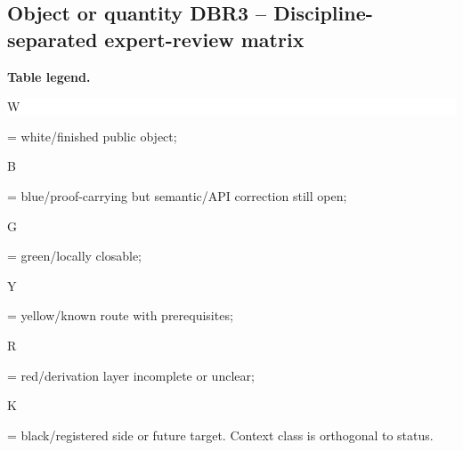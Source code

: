 \subsection*{Object or quantity DBR3 -- Discipline-separated expert-review matrix}
\hypertarget{objproof:DBR3}{}
\par\smallskip\noindent\begin{minipage}{0.99\linewidth}\footnotesize\raggedright\textbf{Table legend.} \colorbox{white}{\strut W} = white/finished public object; \colorbox{cyan!20}{\strut B} = blue/proof-carrying but semantic/API correction still open; \colorbox{green!18}{\strut G} = green/locally closable; \colorbox{yellow!25}{\strut Y} = yellow/known route with prerequisites; \colorbox{red!20}{\strut R} = red/derivation layer incomplete or unclear; \colorbox{black!18}{\strut K} = black/registered side or future target. Context class is orthogonal to status.\end{minipage}\par\vspace{0.25em}
